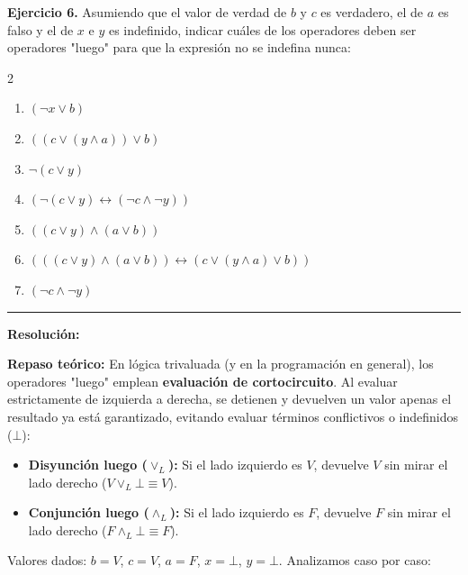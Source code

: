 \hypertarget{ej6}{}
\noindent \textbf{Ejercicio 6.} Asumiendo que el valor de verdad de $b$ y $c$ es verdadero, el de $a$ es falso y el de $x$ e $y$ es indefinido, indicar cuáles de los operadores deben ser operadores "luego" para que la expresión no se indefina nunca:
\begin{multicols}{2}
\begin{enumerate}[label=\alph*)]
    \item $(\neg x \vee b)$
    \item $((c \vee (y \wedge a)) \vee b)$
    \item $\neg(c \vee y)$
    \item $(\neg(c \vee y) \leftrightarrow (\neg c \wedge \neg y))$
    \item $((c \vee y) \wedge (a \vee b))$
    \item $(((c \vee y) \wedge (a \vee b)) \leftrightarrow (c \vee (y \wedge a) \vee b))$
    \item $(\neg c \wedge \neg y)$
\end{enumerate}
\end{multicols}

\vspace{0.2cm}
{\color{gray}\hrule}
\vspace{0.4cm}

\textbf{Resolución:}

\textbf{Repaso teórico:} En lógica trivaluada (y en la programación en general), los operadores "luego" emplean \textbf{evaluación de cortocircuito}. Al evaluar estrictamente de izquierda a derecha, se detienen y devuelven un valor apenas el resultado ya está garantizado, evitando evaluar términos conflictivos o indefinidos ($\bot$):
\begin{itemize}
    \item \textbf{Disyunción luego ($\vee_L$):} Si el lado izquierdo es $V$, devuelve $V$ sin mirar el lado derecho ($V \vee_L \bot \equiv V$).
    \item \textbf{Conjunción luego ($\wedge_L$):} Si el lado izquierdo es $F$, devuelve $F$ sin mirar el lado derecho ($F \wedge_L \bot \equiv F$).
\end{itemize}

Valores dados: $b=V$, $c=V$, $a=F$, $x=\bot$, $y=\bot$. Analizamos caso por caso:

